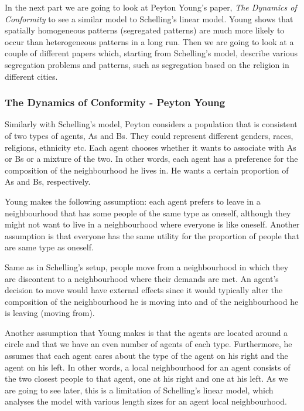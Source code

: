 \documentclass[../main.tex]{subfiles}
\begin{document}
In the next part we are going to look at Peyton Young's paper, \textit{The Dynamics of Conformity}\cite[]{DynamicsofConformity} to see a similar model to Schelling's linear model. Young shows that spatially homogeneous patterns (segregated patterns) are much more likely to occur than heterogeneous patterns in a long run. Then we are going to look at a couple of different papers which, starting from Schelling's model, describe various segregation problems and patterns, such as segregation based on the religion in different cities. 

\subsubsection{The Dynamics of Conformity - Peyton Young}
Similarly with Schelling's model, Peyton considers a population that is consistent of two types of agents, As and Bs. They could represent different genders, races, religions, ethnicity etc. Each agent chooses whether it wants to associate with As or Bs or a mixture of the two. In other words, each agent has a preference for the composition of the neighbourhood he lives in. He wants a certain proportion of As and Bs, respectively.

Young makes the following assumption: each agent prefers to leave in a neighbourhood that has some people of the same type as oneself, although they might not want to live in a neighbourhood where everyone is like oneself. Another assumption is that everyone has the same utility for the proportion of people that are same type as oneself.

Same as in Schelling’s setup, people move from a neighbourhood in which they are discontent to a neighbourhood where their demands are met. An agent’s decision to move would have external effects since it would typically alter the composition of the neighbourhood he is moving into and  of the neighbourhood he is leaving (moving from).

Another assumption that Young makes is that the agents are located around a circle and that we have an even number of agents of each type.  Furthermore, he assumes that each agent cares about the type of the agent on his right and the agent on his left. In other words, a local neighbourhood for an agent consists of the two closest people to that agent, one at his right and one at his left. As we are going to see later, this is a limitation of Schelling’s linear model, which analyses the model with various length sizes for an agent local neighbourhood.
\end{document}

